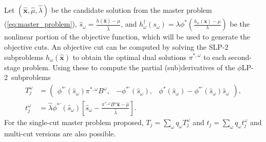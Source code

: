 \documentclass[opre,nonblindrev]{informs3} %
\newcommand{\x}{\mathbf{x}}
\newcommand{\xh}{\hat{\x}}
\newcommand{\lh}{\hat{\lambda}}
\newcommand{\mh}{\hat{\mu}}
\newcommand{\plp}{$\phi$LP-2}
\begin{document}
Let $(\xh,\mh, \lh)$ be the candidate solution from the master problem (\ref{eq:master_problem}), $\hat{s}_\omega = \frac{h(\xh)-\mu}{\lh}$, and $h^\dagger_\omega(s_\omega) = \lambda \phi^*\left(\frac{h_\omega(\x) - \mu}{\lambda}\right)$ be the nonlinear portion of the objective function, which will be used to generate the objective cuts.
An objective cut can be computed by solving the SLP-2 subproblems $h_\omega(\xh)$ to obtain the optimal dual solutions $\pi^{*,\omega}$ to each second-stage problem. Using these to compute the partial (sub)derivatives of the \plp\ subproblems
\begin{align*}
	T_j^\omega & = 
	\left( \begin{array}{ccc}
		\phi^{*\prime}(\hat{s}_\omega) \pi^{*,\omega}B^\omega, 
			 & -\phi^{*\prime}(\hat{s}_\omega), 
			 & \phi^*(\hat{s}_\omega) - \phi^{*\prime}(\hat{s}_\omega) \hat{s}_\omega
	\end{array} \right), \\
	t_j^\omega & = \lh \phi^{*\prime}(\hat{s}_\omega)\left[\hat{s}_\omega - \frac{\pi^{*,\omega}B^\omega\xh - \mh}{\lh}\right].
\end{align*}
For the single-cut master problem proposed, $T_j = \sum_\omega q_\omega T_j^\omega$ and $t_j = \sum_\omega q_\omega t_j^\omega$ and multi-cut versions are also possible. 
\end{document}
